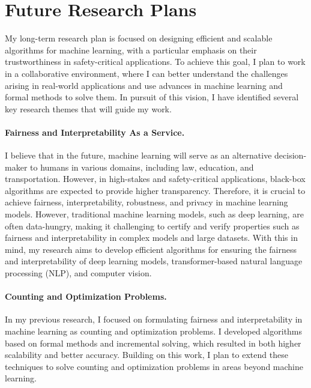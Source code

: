\documentclass[11pt]{article}
\begin{document}
	

	
	\section*{Future Research Plans}
	 My long-term research plan is focused on designing efficient and scalable algorithms for machine learning, with a particular emphasis on their trustworthiness in safety-critical applications. To achieve this goal, I plan to work in a collaborative environment, where I can better understand the challenges arising in real-world applications and use advances in machine learning and formal methods to solve them. In pursuit of this vision, I have identified several key research themes that will guide my work.
	 
	 
	 \paragraph{Fairness and Interpretability As a Service.} I believe that in the future, machine learning will serve as an alternative decision-maker to humans in various domains, including law, education, and transportation. However, in high-stakes and safety-critical applications, black-box algorithms are expected to provide higher transparency. Therefore, it is crucial to achieve fairness, interpretability, robustness, and privacy in machine learning models. However, traditional machine learning models, such as deep learning, are often data-hungry, making it challenging to certify and verify properties such as fairness and interpretability in complex models and large datasets. With this in mind, my research aims to develop efficient algorithms for ensuring the fairness and interpretability of deep learning models, transformer-based natural language processing (NLP), and computer vision. 
	 
	 
	 \paragraph{Counting and Optimization Problems.} In my previous research, I focused on formulating fairness and interpretability in machine learning as counting and optimization problems. I developed algorithms based on formal methods and incremental solving, which resulted in both higher scalability and better accuracy. Building on this work, I plan to extend these techniques to solve counting and optimization problems in areas beyond machine learning.
	
	
			
\end{document}
